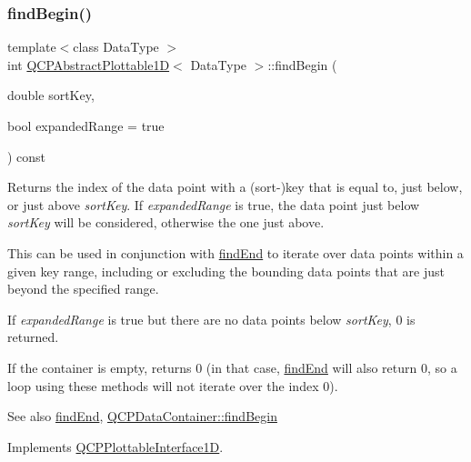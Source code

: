 \subsubsection{\texorpdfstring{find\+Begin()}{findBegin()}}
{\footnotesize\ttfamily template$<$class Data\+Type $>$ \\
int \hyperlink{classQCPAbstractPlottable1D}{Q\+C\+P\+Abstract\+Plottable1D}$<$ Data\+Type $>$\+::find\+Begin (\begin{DoxyParamCaption}\item[{double}]{sort\+Key,  }\item[{bool}]{expanded\+Range = {\ttfamily true} }\end{DoxyParamCaption}) const\hspace{0.3cm}{\ttfamily [virtual]}}





Returns the index of the data point with a (sort-\/)key that is equal to, just below, or just above {\itshape sort\+Key}. If {\itshape expanded\+Range} is true, the data point just below {\itshape sort\+Key} will be considered, otherwise the one just above.

This can be used in conjunction with \hyperlink{classQCPAbstractPlottable1D_a6e3ba20c9160d7361e58070390d10b1a}{find\+End} to iterate over data points within a given key range, including or excluding the bounding data points that are just beyond the specified range.

If {\itshape expanded\+Range} is true but there are no data points below {\itshape sort\+Key}, 0 is returned.

If the container is empty, returns 0 (in that case, \hyperlink{classQCPAbstractPlottable1D_a6e3ba20c9160d7361e58070390d10b1a}{find\+End} will also return 0, so a loop using these methods will not iterate over the index 0).

\begin{DoxySeeAlso}{See also}
\hyperlink{classQCPAbstractPlottable1D_a6e3ba20c9160d7361e58070390d10b1a}{find\+End}, \hyperlink{classQCPDataContainer_a2ad8a5399072d99a242d3a6d2d7e278a}{Q\+C\+P\+Data\+Container\+::find\+Begin} 
\end{DoxySeeAlso}


Implements \hyperlink{classQCPPlottableInterface1D_a5b95783271306a4de97be54eac1e7d13}{Q\+C\+P\+Plottable\+Interface1D}.

\mbox{\label{classQCPAbstractPlottable1D_a6e3ba20c9160d7361e58070390d10b1a}} 
